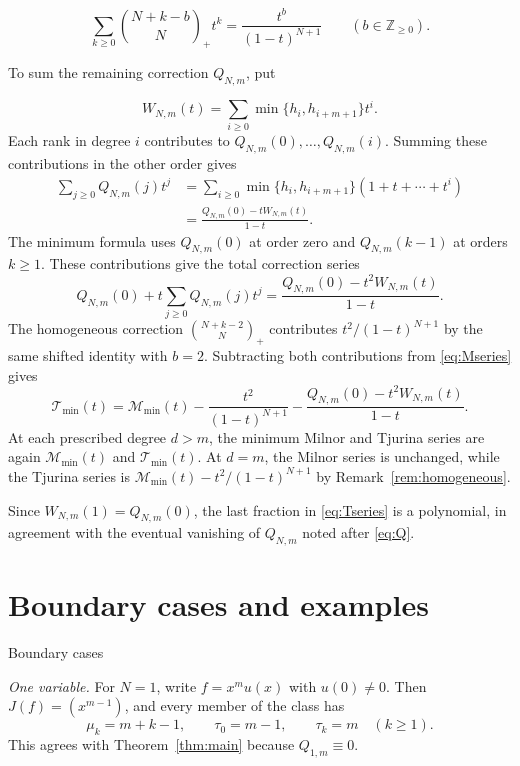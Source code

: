 \documentclass[12pt,reqno]{amsart}
\makeatletter
\renewcommand\subsection{\@startsection{subsection}{2}%
  \z@{.8\linespacing\@plus.3\linespacing}{.35\linespacing}%
  {\normalfont\bfseries}}
\newcommand{\tbin}[2]{\binom{#1}{#2}_{\!+}}
\theoremstyle{definition}
\makeatother
\begin{document}
\[
 \sum_{k\geq0}\tbin{N+k-b}{N}t^k
       =\frac{t^b}{(1-t)^{N+1}}\qquad(b\in\mathbb Z_{\geq0}).
\]


To sum the remaining correction $Q_{N,m}$, put

\[
 W_{N,m}(t)=\sum_{i\geq0}\min\{h_i,h_{i+m+1}\}t^i.
\]
Each rank in degree $i$ contributes to $Q_{N,m}(0),\ldots,Q_{N,m}(i)$.
Summing these contributions in the other order gives
\begin{align*}
 \sum_{j\geq0}Q_{N,m}(j)t^j
   &=\sum_{i\geq0}\min\{h_i,h_{i+m+1}\}(1+t+\cdots+t^i)\\
   &=\frac{Q_{N,m}(0)-tW_{N,m}(t)}{1-t}.
\end{align*}
The minimum formula uses $Q_{N,m}(0)$ at order zero and $Q_{N,m}(k-1)$
at orders $k\geq1$. These contributions give the total correction
series
\[
 Q_{N,m}(0)+t\sum_{j\geq0}Q_{N,m}(j)t^j
       =\frac{Q_{N,m}(0)-t^2W_{N,m}(t)}{1-t}.
\]
The homogeneous correction $\tbin{N+k-2}{N}$ contributes
$t^2/(1-t)^{N+1}$ by the same shifted identity with $b=2$.
Subtracting both contributions from \eqref{eq:Mseries} gives
\begin{equation}\label{eq:Tseries}
 \mathcal T_{\min}(t)=\mathcal M_{\min}(t)
     -\frac{t^2}{(1-t)^{N+1}}
     -\frac{Q_{N,m}(0)-t^2W_{N,m}(t)}{1-t}.
\end{equation}
At each prescribed degree $d>m$, the minimum Milnor and Tjurina
series are again $\mathcal M_{\min}(t)$ and $\mathcal T_{\min}(t)$.
At $d=m$, the Milnor series is unchanged, while the Tjurina series is
$\mathcal M_{\min}(t)-t^2/(1-t)^{N+1}$ by
Remark~\ref{rem:homogeneous}.

Since $W_{N,m}(1)=Q_{N,m}(0)$, the last fraction in
\eqref{eq:Tseries} is a polynomial, in agreement with
the eventual vanishing of $Q_{N,m}$ noted after \eqref{eq:Q}.


\section{Boundary cases and examples}\label{sec:examples}

\subsection{Boundary cases}

\emph{One variable.}
For $N=1$, write $f=x^m u(x)$ with $u(0)\ne0$.
Then $J(f)=(x^{m-1})$, and every member of the class has
\[
 \mu_k=m+k-1,\qquad \tau_0=m-1,\qquad \tau_k=m\quad(k\geq1).
\]
This agrees with Theorem~\ref{thm:main} because $Q_{1,m}\equiv0$.
\end{document}
